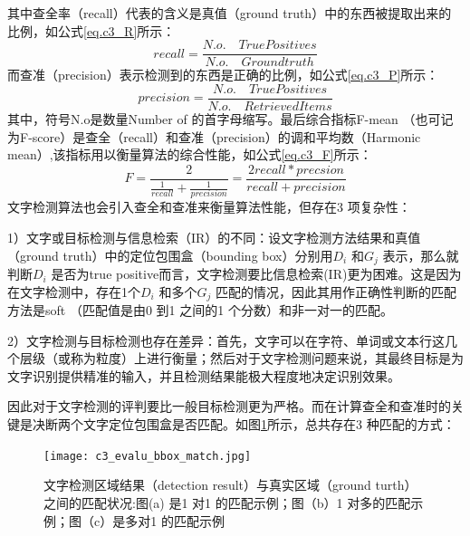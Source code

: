         其中查全率（recall）代表的含义是真值（ground truth）中的东西被提取出来的比例，如公式\ref{eq.c3_R}所示：
        \begin{equation}
        recall=\frac{N.o. \quad True Positives}{N.o. \quad Ground truth}
        \label{eq.c3_R}
        \end{equation}
        而查准（precision）表示检测到的东西是正确的比例，如公式\ref{eq.c3_P}所示：
        \begin{equation}
        precision=\frac{N.o. \quad True Positives}{N.o. \quad Retrieved Items}
        \label{eq.c3_P}
        \end{equation}
        其中，符号N.o是数量Number of 的首字母缩写。最后综合指标F-mean （也可记为F-score）是查全（recall）和查准（precision）的调和平均数（Harmonic mean）,该指标用以衡量算法的综合性能，如公式\ref{eq.c3_F}所示：
        \begin{equation}
        F=\frac{2}{\frac{1}{recall}+\frac{1}{precision}}=\frac{2recall*precsion}{recall+precision}
        \label{eq.c3_F}
        \end{equation}
        文字检测算法也会引入查全和查准来衡量算法性能，但存在3 项复杂性：

        1）文字或目标检测与信息检索（IR）的不同：设文字检测方法结果和真值（ground truth）中的定位包围盒（bounding box）分别用$D_i$ 和$G_j$ 表示，那么就判断$D_i$ 是否为true positive而言，文字检测要比信息检索(IR)更为困难。这是因为在文字检测中，存在1个$D_i$ 和多个$G_j$ 匹配的情况，因此其用作正确性判断的匹配方法是soft （匹配值是由0 到1 之间的1 个分数）和非一对一的匹配。

        2）文字检测与目标检测也存在差异：首先，文字可以在字符、单词或文本行这几个层级（或称为粒度）上进行衡量；然后对于文字检测问题来说，其最终目标是为文字识别提供精准的输入，并且检测结果能极大程度地决定识别效果。

        因此对于文字检测的评判要比一般目标检测更为严格。而在计算查全和查准时的关键是决断两个文字定位包围盒是否匹配。如图\ref{fig.c3_evalu_bbox_match}所示，总共存在3 种匹配的方式：

        \begin{figure}[!h]
        \centering
        \texttt{[image: c3\_evalu\_bbox\_match.jpg]} \caption{文字检测区域结果（detection result）与真实区域（ground turth）之间的匹配状况:图(a) 是1 对1 的匹配示例；图（b）1 对多的匹配示例；图（c）是多对1 的匹配示例}
        \label{fig.c3_evalu_bbox_match}
        \end{figure}

